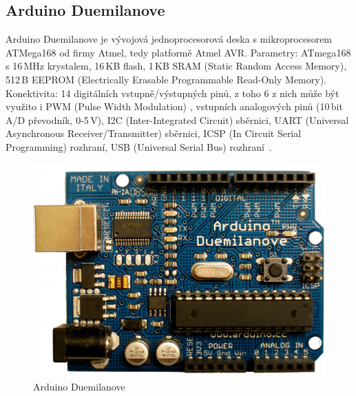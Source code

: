		\subsection{Arduino Duemilanove} Arduino Duemilanove je vývojová jednoprocesorová deska s mikroprocesorem ATMega168 od firmy Atmel, tedy platformě Atmel AVR. 
		Parametry: ATmega168 s 16\,MHz krystalem, 16\,KB flash, 1\,KB SRAM (Static Random Access Memory), 512\,B EEPROM (Electrically Erasable Programmable Read-Only Memory). 	Konektivita: 14 digitálních vstupně/výstupných pinů, z toho 6 z nich může být využito i PWM (Pulse Width Modulation) , vstupních analogových pinů (10\,bit A/D převodník, 0-5\,V), I2C (Inter-Integrated Circuit) sběrnici, UART (Universal Asynchronous Receiver/Transmitter) sběrnici, ICSP (In Circuit Serial Programming) rozhraní, USB (Universal Serial Bus) rozhraní~\cite{ArduinoDuemilanove}.	
			\begin{figure}[!h]
  \begin{center}
    \includegraphics[scale=0.2]{obrazky/emded_arduino_duemilanove}
  \end{center}
  \caption{Arduino Duemilanove~\cite{ArduinoDuemilanove}}
\end{figure}
	
	
